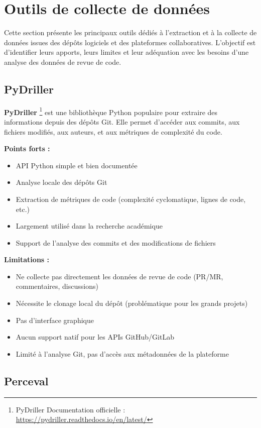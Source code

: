 \section{Outils de collecte de données}
Cette section présente les principaux outils dédiés à l’extraction et à la collecte de données issues des dépôts logiciels et des plateformes collaboratives. L’objectif est d’identifier leurs apports, leurs limites et leur adéquation avec les besoins d’une analyse des données de revue de code.

\subsection{PyDriller}

\textbf{PyDriller} \footnote{PyDriller Documentation officielle : \url{https://pydriller.readthedocs.io/en/latest/}}  est une bibliothèque Python populaire pour extraire des informations depuis des dépôts Git. Elle permet d'accéder aux commits, aux fichiers modifiés, aux auteurs, et aux métriques de complexité du code.

\textbf{Points forts :}
\begin{itemize}
    \item API Python simple et bien documentée
    \item Analyse locale des dépôts Git
    \item Extraction de métriques de code (complexité cyclomatique, lignes de code, etc.)
    \item Largement utilisé dans la recherche académique
    \item Support de l'analyse des commits et des modifications de fichiers
\end{itemize}

\textbf{Limitations :}
\begin{itemize}
    \item Ne collecte pas directement les données de revue de code (PR/MR, commentaires, discussions)
    \item Nécessite le clonage local du dépôt (problématique pour les grands projets)
    \item Pas d'interface graphique
    \item Aucun support natif pour les APIs GitHub/GitLab
    \item Limité à l'analyse Git, pas d'accès aux métadonnées de la plateforme
\end{itemize}

\subsection{Perceval}

